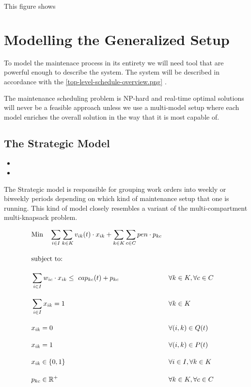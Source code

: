 This figure shows 



\chapter{Modelling the Generalized Setup}
To model the maintenace process in its entirety we will need tool that are powerful enough to describe the system. The system will be described in accordance 
with the \ref{top-level-schedule-overview.png} \cite{palmer_maintenance_2019}.

The maintenance scheduling problem is NP-hard and real-time optimal solutions will never be a feasible approach unless we use a multi-model setup where each model enriches the 
overall solution in the way that it is most capable of. 



\section{The Strategic Model}


\begin{itemize}
	\item 
	\item 
\end{itemize}

The Strategic model is responsible for grouping work orders into weekly or biweekly periods depending on which kind of maintenance setup that one is running.
This kind of model closely resembles a variant of the multi-compartment multi-knapsack problem.


\begin{align}
	& \text{Min} \quad \sum_{i \in I} \sum_{k \in K} v_{ik}(t) \cdot x_{ik} + \sum_{k \in K} \sum_{c \in C} pen \cdot p_{kc}   \label{eqn:objective_function_strategic} \\[1em]
    & \text{subject to:} \notag                                                                                                    \\[1em]
	& \sum_{i \in I} w_{ic} \cdot x_{ik} \leq \ cap_{kc}(t) + p_{kc}&& \forall k \in K, \forall c \in C   \label{eqn:capacity_constraint}          \\[1em]
	& \sum_{i \in I} x_{ik} = 1                                 && \forall k \in K                    \label{eqn:single_workorder_constraint}  \\[1em]
	& x_{ik} = 0                                                  && \forall (i, k) \in Q(t)            \label{eqn:exclusion_constraint}         \\[1em]
	& x_{ik} = 1                                                  && \forall (i, k) \in P(t)            \label{eqn:inclusion_constraint}         \\[1em]
	& x_{ik} \in \{0, 1\}                                         && \forall i \in I, \forall k \in K   \label{eqn:x_integrality_constraint}     \\[1em] 
	& p_{kc} \in \mathbb{R}^{+}                                   && \forall k \in K, \forall c \in C   \label{eqn:p_non_negativity_constraint}  \\[1em]
\end{align}

